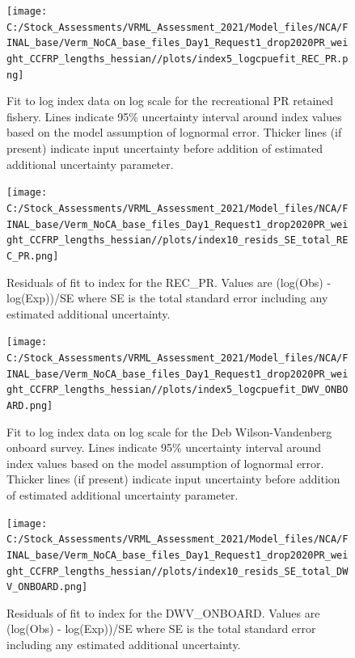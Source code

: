 \documentclass[
  english,
  a4paper,
]{article}
\begin{document}
\begin{figure}
\centering
\texttt{[image: C:/Stock\_Assessments/VRML\_Assessment\_2021/Model\_files/NCA/FINAL\_base/Verm\_NoCA\_base\_files\_Day1\_Request1\_drop2020PR\_weight\_CCFRP\_lengths\_hessian//plots/index5\_logcpuefit\_REC\_PR.png]}
\caption{Fit to log index data on log scale for the recreational PR retained fishery. Lines indicate 95\% uncertainty interval around index values based on the model assumption of lognormal error. Thicker lines (if present) indicate input uncertainty before addition of estimated additional uncertainty parameter.\label{fig:log-cpue-REC-PR}}
\end{figure}

\begin{figure}
\centering
\texttt{[image: C:/Stock\_Assessments/VRML\_Assessment\_2021/Model\_files/NCA/FINAL\_base/Verm\_NoCA\_base\_files\_Day1\_Request1\_drop2020PR\_weight\_CCFRP\_lengths\_hessian//plots/index10\_resids\_SE\_total\_REC\_PR.png]}
\caption{Residuals of fit to index for the REC\_PR. Values are (log(Obs) - log(Exp))/SE where SE is the total standard error including any estimated additional uncertainty.\label{fig:cpue-resid-REC-PR}}
\end{figure}

\begin{figure}
\centering
\texttt{[image: C:/Stock\_Assessments/VRML\_Assessment\_2021/Model\_files/NCA/FINAL\_base/Verm\_NoCA\_base\_files\_Day1\_Request1\_drop2020PR\_weight\_CCFRP\_lengths\_hessian//plots/index5\_logcpuefit\_DWV\_ONBOARD.png]}
\caption{Fit to log index data on log scale for the Deb Wilson-Vandenberg onboard survey. Lines indicate 95\% uncertainty interval around index values based on the model assumption of lognormal error. Thicker lines (if present) indicate input uncertainty before addition of estimated additional uncertainty parameter.\label{fig:log-cpue-DWV-ONBOARD}}
\end{figure}

\begin{figure}
\centering
\texttt{[image: C:/Stock\_Assessments/VRML\_Assessment\_2021/Model\_files/NCA/FINAL\_base/Verm\_NoCA\_base\_files\_Day1\_Request1\_drop2020PR\_weight\_CCFRP\_lengths\_hessian//plots/index10\_resids\_SE\_total\_DWV\_ONBOARD.png]}
\caption{Residuals of fit to index for the DWV\_ONBOARD. Values are (log(Obs) - log(Exp))/SE where SE is the total standard error including any estimated additional uncertainty.\label{fig:cpue-resid-DWV-ONBOARD}}
\end{figure}
\end{document}
